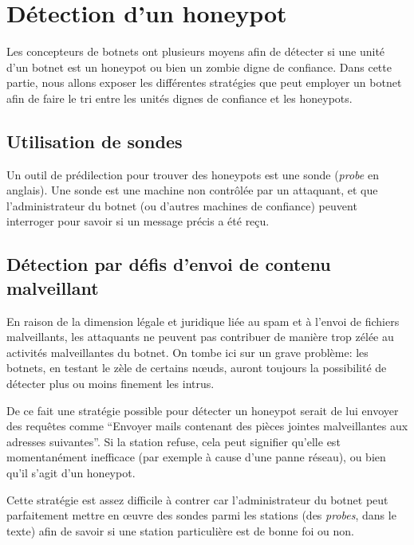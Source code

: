 \section{Détection d'un honeypot}

Les concepteurs de botnets ont plusieurs moyens afin de détecter si une unité
d'un botnet est un honeypot ou bien un zombie digne de confiance.  Dans cette
partie, nous allons exposer les différentes stratégies que peut employer un
botnet afin de faire le tri entre les unités dignes de con\-fiance et les
honeypots.

\subsection{Utilisation de sondes}

Un outil de prédilection pour trouver des honeypots est une sonde
(\textit{probe} en anglais).  Une sonde est une machine non contrôlée par un
attaquant, et que l'administrateur du botnet (ou d'autres machines de
confiance) peuvent interroger pour savoir si un message précis a été reçu.

\subsection{Détection par défis d'envoi de contenu malveillant}

En raison de la dimension légale et juridique liée au spam et à l'envoi de
fichiers malveillants, les attaquants ne peuvent pas contribuer de manière trop
zélée au activités malveillantes du botnet. On tombe ici sur un grave problème:
les botnets, en testant le zèle de certains nœuds, auront toujours la
possibilité de détecter plus ou moins finement les intrus.

De ce fait une stratégie possible pour détecter un honeypot serait de lui
envoyer des requêtes comme ``Envoyer  mails contenant des pièces
jointes malveillantes aux adresses suivantes''. Si la station refuse, cela peut
signifier qu'elle est momentanément inefficace (par exemple à cause d'une panne
réseau), ou bien qu'il s'agit d'un honeypot.

Cette stratégie est assez difficile à contrer car l'administrateur du botnet
peut parfaitement mettre en œuvre des sondes parmi les stations (des
\textit{probes}, dans le texte) afin de savoir si une station particulière est
de bonne foi ou non.

